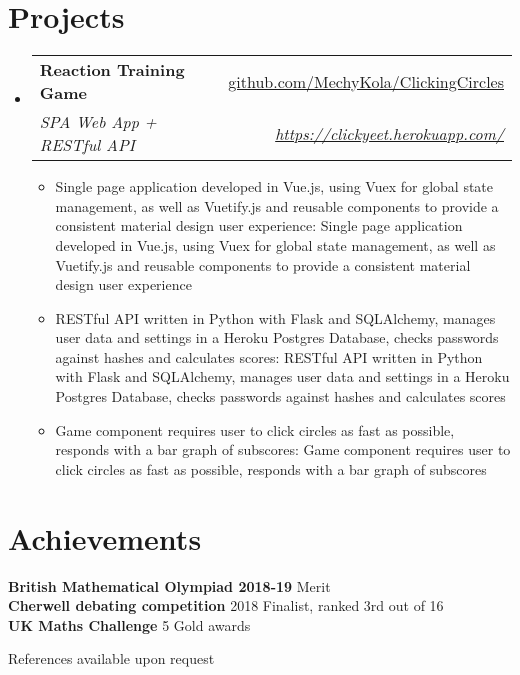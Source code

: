 \documentclass[a4paper,11pt]{article}
\makeatletter
\def \ifempty#1{\def\temp{#1} \ifx\temp\empty }
\newcommand{\resumeItem}[2]{
  \item\small{
  	\ifempty{#1}#2\else\textbf{#1}{: #2 \vspace{-2pt}}\fi
  }
}
\newcommand{\resumeSubheading}[4]{
  \vspace{-1pt}\item
    \begin{tabular*}{0.97\textwidth}{l@{\extracolsep{\fill}}r}
      \textbf{#1} & #2 \\
      \textit{\small#3} & \textit{\small #4} \\
    \end{tabular*}\vspace{-5pt}
}
\newcommand{\resumeSubHeadingListStart}{\begin{itemize}[leftmargin=*]}
\newcommand{\resumeSubHeadingListEnd}{\end{itemize}}
\newcommand{\resumeItemListStart}{\begin{itemize}}
\newcommand{\resumeItemListEnd}{\end{itemize}\vspace{-5pt}}
\makeatother
\begin{document}
\section{Projects}
  \resumeSubHeadingListStart
    \resumeSubheading
      {Reaction Training Game}{\href{https://github.com/MechyKola/ClickingCircles}
      {github.com/MechyKola/ClickingCircles}}
      {SPA Web App + RESTful API}{\href{https://clickyeet.herokuapp.com/}
      {https://clickyeet.herokuapp.com/}}
      \resumeItemListStart
        \resumeItem{}
          {Single page application developed in Vue.js, using Vuex for global state management,
          as well as Vuetify.js and reusable components to provide a consistent material design
          user experience}
        \resumeItem{}
          {RESTful API written in Python with Flask and SQLAlchemy, manages user data and 
          settings in a Heroku Postgres Database, checks passwords against 
          hashes and calculates scores}
        \resumeItem{}
          {Game component requires user to click circles as fast as possible, responds with
          a bar graph of subscores}
      \resumeItemListEnd
  \resumeSubHeadingListEnd


\section{Achievements}
  \textbf{British Mathematical Olympiad 2018-19}{ Merit} \\
  \textbf{Cherwell debating competition}{ 2018 Finalist, ranked 3rd out of 16} \\
  \textbf{UK Maths Challenge}{ 5 Gold  awards} \\
  
  
\bigskip
\centerline{References available upon request}
\end{document}
